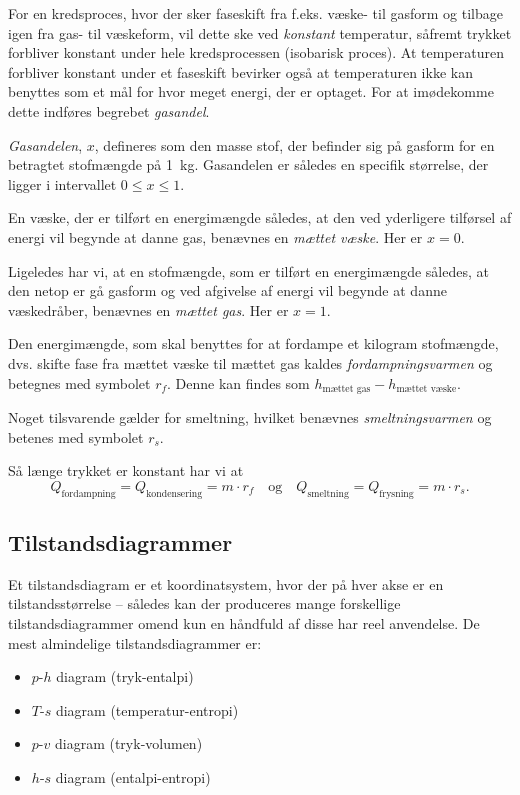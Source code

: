 For en kredsproces, hvor der sker faseskift fra f.eks. væske- til gasform og tilbage igen fra gas- til væskeform, vil dette ske ved \textit{konstant} temperatur, såfremt trykket forbliver konstant under hele kredsprocessen (isobarisk proces). At temperaturen forbliver konstant under et faseskift bevirker også at temperaturen ikke kan benyttes som et mål for hvor meget energi, der er optaget. For at imødekomme dette indføres begrebet \textit{gasandel}.

\begin{definition}[Gasandel]
  \textit{Gasandelen}, $x$, defineres som den masse stof, der befinder sig på gasform for en betragtet stofmængde på \qty{1}{kg}. Gasandelen er således en specifik størrelse, der ligger i intervallet $0\leq x\leq 1$. 
\end{definition}

\begin{definition}
  En væske, der er tilført en energimængde således, at den ved yderligere tilførsel af energi vil begynde at danne gas, benævnes en \textit{mættet væske}. Her er $x = 0$. 

  Ligeledes har vi, at en stofmængde, som er tilført en energimængde således, at den netop er gå gasform og ved afgivelse af energi vil begynde at danne væskedråber, benævnes en \textit{mættet gas}. Her er $x = 1$. 
\end{definition}

\begin{definition}[Fordampningsvarmen]
  Den energimængde, som skal benyttes for at fordampe et kilogram stofmængde, dvs. skifte fase fra mættet væske til mættet gas kaldes \textit{fordampningsvarmen} og betegnes med symbolet $r_f$. Denne kan findes som $h_{\text{mættet gas}} - h_{\text{mættet væske}}$. 

  Noget tilsvarende gælder for smeltning, hvilket benævnes \textit{smeltningsvarmen} og betenes med symbolet $r_s$. 
\end{definition}

Så længe trykket er konstant har vi at
\[ 
Q_{\text{fordampning}} = Q_{\text{kondensering}} = m \cdot r_f \quad \text{og} \quad Q_{\text{smeltning}} = Q_{\text{frysning}} = m \cdot r_s
.\]

\subsection{Tilstandsdiagrammer}
Et tilstandsdiagram er et koordinatsystem, hvor der på hver akse er en tilstandsstørrelse -- således kan der produceres mange forskellige tilstandsdiagrammer omend kun en håndfuld af disse har reel anvendelse. De mest almindelige tilstandsdiagrammer er:
\begin{itemize}
  \item $p$-$h$ diagram (tryk-entalpi)
  \item $T$-$s$ diagram (temperatur-entropi)
  \item $p$-$v$ diagram (tryk-volumen)
  \item $h$-$s$ diagram (entalpi-entropi)
\end{itemize}

